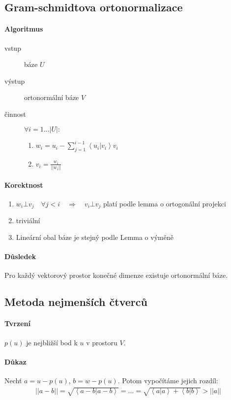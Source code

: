 \documentclass[a4paper,10pt]{article}
\begin{document}
\subsection{Gram-schmidtova ortonormalizace}
\setcounter{equation}{0}
\paragraph{Algoritmus}
\begin{description}
	\item[vstup] báze $U$
	\item[výstup] ortonormální báze $V$
	\item[činnost]
		$\forall i = 1 ... |U|:$
		\begin{enumerate}
			\item $w_i = u_i - \sum_{j=1}^{i-1}\left<u_i|v_i\right>v_i$
			\item $v_i = \frac{w_i}{||w_i||}$
		\end{enumerate}
\end{description}
\paragraph{Korektnost}
\begin{enumerate}
	\item $w_i \bot v_j \quad \forall j < i \quad \Rightarrow \quad v_i \bot
	v_j$ platí podle lemma o ortogonální projekci
	\item triviální
	\item Lineární obal báze je stejný podle Lemma o výměně
\end{enumerate}
\paragraph{Důsledek}
Pro každý vektorový prostor konečné dimenze existuje ortonormální báze.

\subsection{Metoda nejmenších čtverců}
\setcounter{equation}{0}
\paragraph{Tvrzení}
$p(u)$ je nejbližší bod k $u$ v prostoru $V$.
\paragraph{Důkaz}
Nechť $a = u - p(u)$, $b = w - p(u)$. Potom vypočítáme jejich rozdíl:
\begin{align}
	||a - b|| = \sqrt{\left<a-b|a-b\right>} = ... = \sqrt{\left<a|a\right> +
	\left<b|b\right>} \gt ||a||
\end{align}
\end{document}
